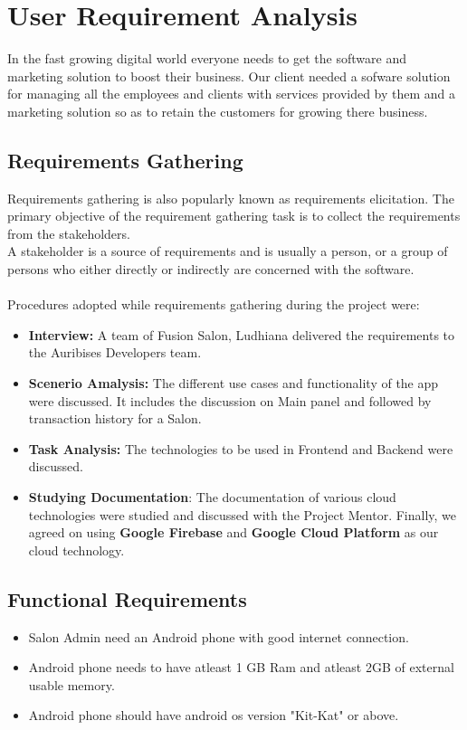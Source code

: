 \section{User Requirement Analysis}

In the fast growing digital world everyone needs to get the software and marketing solution to boost their business. Our client needed a sofware solution for managing all the employees and clients with services provided by them and a marketing solution so as to retain the customers for growing there business.

\subsection{Requirements Gathering}
Requirements gathering is also popularly known as requirements elicitation. The primary objective of the requirement gathering task is to collect the requirements from the stakeholders.\\
A stakeholder is a source of requirements and is usually a person, or a group of persons who either directly or indirectly are concerned with the software.\\
\\
Procedures adopted while requirements gathering during the project were:
\begin{itemize}
	\item \textbf{Interview:} A team of Fusion Salon, Ludhiana delivered the requirements to the Auribises Developers team.
	\item \textbf{Scenerio Amalysis:} The different use cases and functionality of the app were discussed. It includes the discussion on Main panel and followed by transaction history for a Salon.
	\item \textbf{Task Analysis:} The technologies to be used in Frontend and Backend were discussed.
	\item \textbf{Studying Documentation}: The documentation of various cloud technologies were studied and discussed with the Project Mentor. Finally, we agreed on using \textbf{Google Firebase} and \textbf{Google Cloud Platform} as our cloud technology.
\end{itemize}
\subsection{Functional Requirements}
\begin{itemize}
	\item Salon Admin need an Android phone with good internet connection.
	\item Android phone needs to have atleast 1 GB Ram and atleast 2GB of external usable memory.
	\item Android phone should have android os version "Kit-Kat" or above.
\end{itemize}
